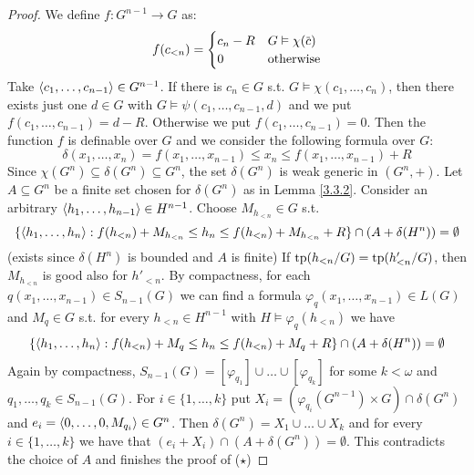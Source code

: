 \documentclass[11pt]{article}
\begin{document}
\begin{proof}
We define \(f:G^{n-1}\to G\) as:
\begin{equation*}
f(c_{<n})=
\begin{cases}
c_n-R&G\vDash\chi(\barc)\\
0&\text{otherwise}
\end{cases}
\end{equation*}
Take \(\langle c_1,\dots,c_{n-1}\rangle\in G^{n-1}\). If there is \(c_n\in G\)
s.t. \(G\vDash\chi(c_1,\dots,c_n)\), then there exists just one \(d\in G\) with \(G\vDash\psi(c_1,\dots,c_{n-1},d)\) and we
put \(f(c_1,\dots,c_{n-1})=d-R\). Otherwise we put \(f(c_1,\dots,c_{n-1})=0\). Then the function \(f\) is
definable over \(G\) and we consider the following formula over \(G\):
\begin{equation*}
\delta(x_1,\dots,x_n)=f(x_1,\dots,x_{n-1})\le x_n\le f(x_1,\dots,x_{n-1})+R
\end{equation*}
Since \(\chi(G^n)\subseteq\delta(G^n)\subseteq G^n\), the set \(\delta(G^n)\) is weak generic in \((G^n,+)\). Let \(A\subseteq G^n\) be a
finite set chosen for \(\delta(G^n)\) as in Lemma \ref{3.3.2}. Consider an
arbitrary \(\langle h_1,\dots,h_{n-1}\rangle\in H^{n-1}\). Choose \(M_{h_{<n}}\in G\) s.t.
\begin{equation*}
\{\langle h_1,\dots,h_n\rangle:f(h_{<n})+M_{h_{<n}}\le h_n\le f(h_{<n})+M_{h_{<n}}+R\}
\cap(A+\delta(H^n))=\emptyset
\end{equation*}
(exists since \(\delta(H^n)\) is bounded and \(A\) is finite)
If \(\operatorname{tp}(h_{<n}/G)=\operatorname{tp}(h'_{<n}/G)\), then \(M_{h_{<n}}\) is good also for \(h'_{<n}\). By
compactness, for each \(q(x_1,\dots,x_{n-1})\in S_{n-1}(G)\) we can find a
formula \(\varphi_q(x_1,\dots,x_{n-1})\in L(G)\) and \(M_q\in G\) s.t. for every \(h_{<n}\in H^{n-1}\) with
\(H\vDash\varphi_q(h_{<n})\) we have
\begin{equation*}
\{\langle h_1,\dots,h_n\rangle:f(h_{<n})+M_q\le h_n\le f(h_{<n})+M_q+R\}\cap(A+\delta(H^n))=\emptyset
\end{equation*}
Again by compactness, \(S_{n-1}(G)=[\varphi_{q_1}]\cup\dots\cup[\varphi_{q_k}]\) for some \(k<\omega\)
and \(q_1,\dots,q_k\in S_{n-1}(G)\).
For \(i\in\{1,\dots,k\}\) put \(X_i=(\varphi_{q_i}(G^{n-1})\times G)\cap\delta(G^n)\)
and \(e_i=\langle 0,\dots,0,M_{q_i}\rangle\in G^n\). Then \(\delta(G^n)=X_1\cup\dots\cup X_k\) and for every \(i\in\{1,\dots,k\}\) we have
that \((e_i+X_i)\cap(A+\delta(G^n))=\emptyset\). This contradicts the choice of \(A\) and finishes the proof of (\(\star\))
\end{proof}
\end{document}
